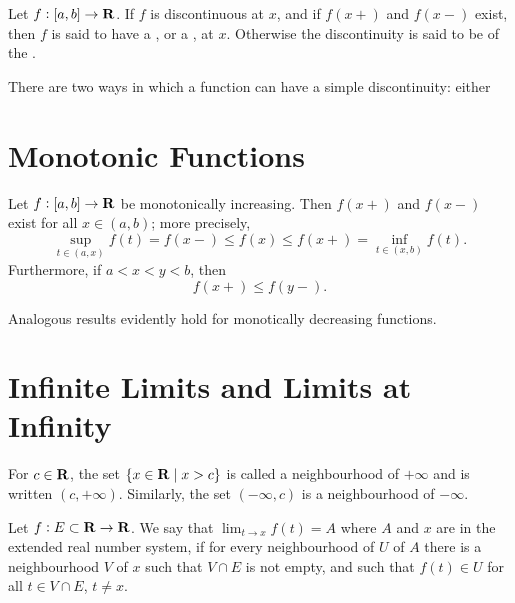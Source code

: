 \begin{definition}[Discontinuities]
Let $f:[a,b]\to\mathbf R$. If $f$ is discontinuous at $x$, and if $f(x+)$ and $f(x-)$ exist, then $f$ is said to have a , or a , at $x$. Otherwise the discontinuity is said to be of the .
\end{definition}

There are two ways in which a function can have a simple discontinuity: either  

\section{Monotonic Functions}
\begin{proposition}
Let $f:[a,b]\to\mathbf R$ be monotonically increasing. Then $f(x+)$ and $f(x-)$ exist for all $x\in(a,b)$; more precisely,
\[\sup_{t\in(a,x)}f(t)=f(x-)\le f(x)\le f(x+)=\inf_{t\in(x,b)}f(t).\]
Furthermore, if $a<x<y<b$, then
\[f(x+)\le f(y-).\]
\end{proposition}

Analogous results evidently hold for monotically decreasing functions.

\section{Infinite Limits and Limits at Infinity}
\begin{definition}
For $c\in\mathbf R$, the set $\{x\in\mathbf R\mid x>c\}$ is called a neighbourhood of $+\infty$ and is written $(c,+\infty)$. Similarly, the set $(-\infty,c)$ is a neighbourhood of $-\infty$.
\end{definition}

\begin{definition}
Let $f:E\subset\mathbf R\to\mathbf R$. We say that $\displaystyle\lim_{t\to x}f(t)=A$ where $A$ and $x$ are in the extended real number system, if for every neighbourhood of $U$ of $A$ there is a neighbourhood $V$ of $x$ such that $V\cap E$ is not empty, and such that $f(t)\in U$ for all $t\in V\cap E$, $t\neq x$.
\end{definition}